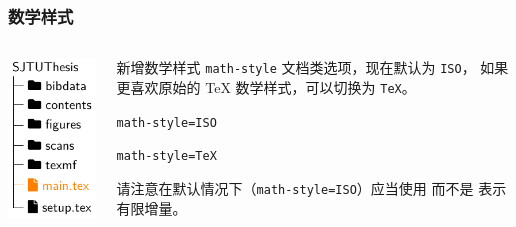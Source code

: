 \begin{frame}[label={frame:math-style}]
  \frametitle{数学样式}
  \begin{columns}
    \begin{column}{0.35\textwidth}
      \includegraphics[page=2,scale=0.9]{support/figures/thesisdir.pdf}
    \end{column}
    \begin{column}{0.65\textwidth}
      新增数学样式 \texttt{math-style} 文档类选项，现在默认为 \texttt{ISO}，
      如果更喜欢原始的 \TeX{} 数学样式，可以切换为 \texttt{TeX}。

      \begin{minipage}[c]{10em}
        \texttt{math-style=ISO}
      \end{minipage}
      \begin{minipage}[c]{5cm}
      \end{minipage}
       
      \begin{minipage}[c]{10em}
        \texttt{math-style=TeX}
      \end{minipage}
      \begin{minipage}[c]{5cm}
      \end{minipage}

      \begin{block}{}
        请注意在默认情况下（\texttt{math-style=ISO}）应当使用  而不是  表示有限增量。
      \end{block}
    \end{column}
  \end{columns}
\end{frame}

